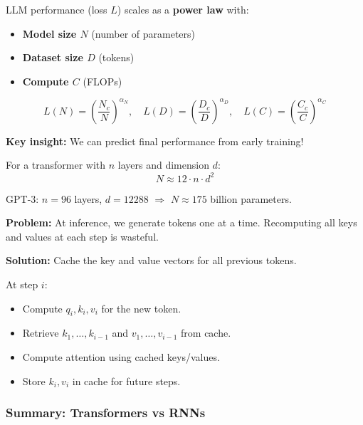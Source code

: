\begin{defbox}
LLM performance (loss $L$) scales as a \textbf{power law} with:
\begin{itemize}
  \item \textbf{Model size $N$} (number of parameters)
  \item \textbf{Dataset size $D$} (tokens)
  \item \textbf{Compute $C$} (FLOPs)
\end{itemize}

\[
L(N) = \left(\frac{N_c}{N}\right)^{\alpha_N}, \quad L(D) = \left(\frac{D_c}{D}\right)^{\alpha_D}, \quad L(C) = \left(\frac{C_c}{C}\right)^{\alpha_C}
\]

\textbf{Key insight:} We can predict final performance from early training!
\end{defbox}

\begin{exbox}
For a transformer with $n$ layers and dimension $d$:
\[
N \approx 12 \cdot n \cdot d^2
\]

GPT-3: $n = 96$ layers, $d = 12288$ $\Rightarrow$ $N \approx 175$ billion parameters.
\end{exbox}

\begin{defbox}[KV Cache]
\textbf{Problem:} At inference, we generate tokens one at a time. Recomputing all keys and values at each step is wasteful.

\textbf{Solution:} Cache the key and value vectors for all previous tokens.

At step $i$:
\begin{itemize}
  \item Compute $q_i, k_i, v_i$ for the new token.
  \item Retrieve $k_1, \ldots, k_{i-1}$ and $v_1, \ldots, v_{i-1}$ from cache.
  \item Compute attention using cached keys/values.
  \item Store $k_i, v_i$ in cache for future steps.
\end{itemize}
\end{defbox}

\bigseparator

\subsubsection{Summary: Transformers vs RNNs}

